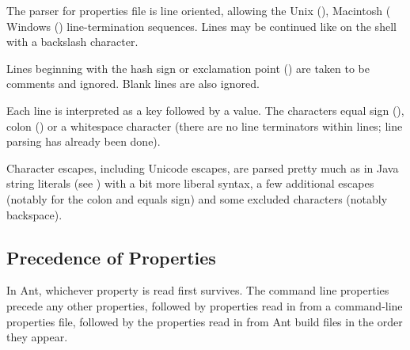 The parser for properties file is line oriented, allowing the Unix
(), Macintosh ( Windows
() line-termination sequences.  Lines may be continued
like on the shell with a backslash character.

Lines beginning with the hash sign \code{\#} or exclamation point
(\code{!}) are taken to be comments and ignored.  Blank lines are also
ignored.

Each line is interpreted as a key followed by a value.  The characters
equal sign (\code{=}), colon (\code{:}) or a whitespace character
(there are no line terminators within lines; line parsing has already
been done).

Character escapes, including Unicode escapes, are parsed pretty much
as in Java string literals (see ) with a bit
more liberal syntax, a few additional escapes (notably for the colon
and equals sign) and some excluded characters (notably backspace).


\subsection{Precedence of Properties}

In Ant, whichever property is read first survives.  The command
line properties precede any other properties, followed by properties
read in from a command-line properties file, followed by the
properties read in from Ant build files in the order they appear.


